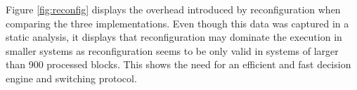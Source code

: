 Figure \ref{fig:reconfig} displays the overhead introduced by reconfiguration when comparing the three implementations. Even though this data was captured in a static analysis, it displays that reconfiguration may dominate the execution in smaller systems as reconfiguration seems to be only valid in systems of larger than 900 processed blocks. This shows the need for an efficient and fast decision engine and switching protocol. 
%
